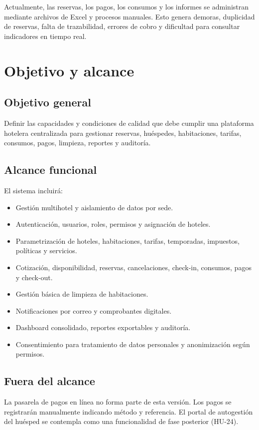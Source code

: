 \documentclass[12pt,a4paper]{article}
\begin{document}
Actualmente, las reservas, los pagos, los consumos y los informes se administran mediante archivos de Excel y procesos manuales. Esto genera demoras, duplicidad de reservas, falta de trazabilidad, errores de cobro y dificultad para consultar indicadores en tiempo real.

\section{Objetivo y alcance}

\subsection{Objetivo general}
Definir las capacidades y condiciones de calidad que debe cumplir una plataforma hotelera centralizada para gestionar reservas, huéspedes, habitaciones, tarifas, consumos, pagos, limpieza, reportes y auditoría.

\subsection{Alcance funcional}
El sistema incluirá:
\begin{itemize}
  \item Gestión multihotel y aislamiento de datos por sede.
  \item Autenticación, usuarios, roles, permisos y asignación de hoteles.
  \item Parametrización de hoteles, habitaciones, tarifas, temporadas, impuestos, políticas y servicios.
  \item Cotización, disponibilidad, reservas, cancelaciones, check-in, consumos, pagos y check-out.
  \item Gestión básica de limpieza de habitaciones.
  \item Notificaciones por correo y comprobantes digitales.
  \item Dashboard consolidado, reportes exportables y auditoría.
  \item Consentimiento para tratamiento de datos personales y anonimización según permisos.
\end{itemize}

\subsection{Fuera del alcance}
La pasarela de pagos en línea no forma parte de esta versión. Los pagos se registrarán manualmente indicando método y referencia. El portal de autogestión del huésped se contempla como una funcionalidad de fase posterior (HU-24).
\end{document}
